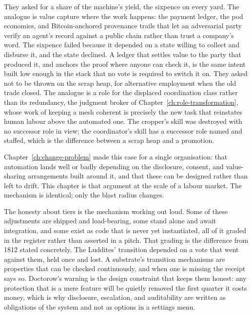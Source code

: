 They asked for a share of the machine's yield, the sixpence on every yard. The analogue is value capture where the work happens: the payment ledger, the pod economics, and Bitcoin-anchored provenance trails that let an adversarial party verify an agent's record against a public chain rather than trust a company's word. The sixpence failed because it depended on a state willing to collect and disburse it, and the state declined. A ledger that settles value to the party that produced it, and anchors the proof where anyone can check it, is the same intent built low enough in the stack that no vote is required to switch it on. They asked not to be thrown on the scrap heap, for alternative employment when the old trade closed. The analogue is a role for the displaced coordination class rather than its redundancy, the judgment broker of Chapter~\ref{ch:role-transformation}, whose work of keeping a mesh coherent is precisely the new task that reinstates human labour above the automated one. The cropper's skill was destroyed with no successor role in view; the coordinator's skill has a successor role named and staffed, which is the difference between a scrap heap and a promotion.

\begin{keyinsight}[title={Same Argument, Societal Scale}]
Chapter~\ref{ch:change-problem} made this case for a single organisation: that automation lands well or badly depending on the disclosure, consent, and value-sharing arrangements built around it, and that these can be designed rather than left to drift. This chapter is that argument at the scale of a labour market. The mechanism is identical; only the blast radius changes.
\end{keyinsight}

The honesty about tiers is the mechanism working out loud. Some of these adjustments are shipped and load-bearing, some stand alone and await integration, and some exist as code that is never yet instantiated, all of it graded in the register rather than asserted in a pitch. That grading is the difference from 1812 stated concretely. The Luddites' transition depended on a vote that went against them, held once and lost. A substrate's transition mechanisms are properties that can be checked continuously, and when one is missing the receipt says so. Doctorow's warning is the design constraint that keeps them honest: any protection that is a mere feature will be quietly removed the first quarter it costs money, which is why disclosure, escalation, and auditability are written as obligations of the system and not as options in a settings menu.

